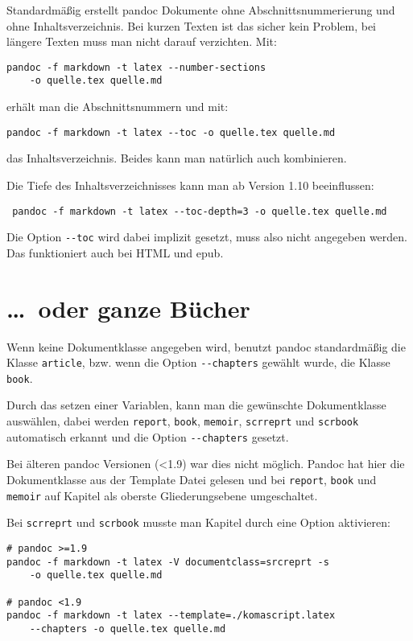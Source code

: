 \documentclass[11pt,ngerman,a4paper]{article}
\begin{document}
Standardmäßig erstellt pandoc Dokumente ohne Abschnittsnummerierung und
ohne Inhaltsverzeichnis. Bei kurzen Texten ist das sicher kein Problem,
bei längere Texten muss man nicht darauf verzichten. Mit:

\begin{verbatim}
pandoc -f markdown -t latex --number-sections 
    -o quelle.tex quelle.md
\end{verbatim}

erhält man die Abschnittsnummern und mit:

\begin{verbatim}
pandoc -f markdown -t latex --toc -o quelle.tex quelle.md
\end{verbatim}

das Inhaltsverzeichnis. Beides kann man natürlich auch kombinieren.

Die Tiefe des Inhaltsverzeichnisses kann man ab Version 1.10
beeinflussen:

\begin{verbatim}
 pandoc -f markdown -t latex --toc-depth=3 -o quelle.tex quelle.md
\end{verbatim}

Die Option \texttt{-{}-toc} wird dabei implizit gesetzt, muss also nicht
angegeben werden. Das funktioniert auch bei HTML und epub.

\section{\ldots{}~oder ganze Bücher}\label{oder-ganze-buxfccher}

Wenn keine Dokumentklasse angegeben wird, benutzt pandoc standardmäßig
die Klasse \texttt{article}, bzw. wenn die Option \texttt{-{}-chapters}
gewählt wurde, die Klasse \texttt{book}.

Durch das setzen einer Variablen, kann man die gewünschte Dokumentklasse
auswählen, dabei werden \texttt{report}, \texttt{book}, \texttt{memoir},
\texttt{scrreprt} und \texttt{scrbook} automatisch erkannt und die
Option \texttt{-{}-chapters} gesetzt.

Bei älteren pandoc Versionen (\textless{}1.9) war dies nicht möglich.
Pandoc hat hier die Dokumentklasse aus der Template Datei gelesen und
bei \texttt{report}, \texttt{book} und \texttt{memoir} auf Kapitel als
oberste Gliederungsebene umgeschaltet.

Bei \texttt{scrreprt} und \texttt{scrbook} musste man Kapitel durch eine
Option aktivieren:

\begin{verbatim}
# pandoc >=1.9
pandoc -f markdown -t latex -V documentclass=srcreprt -s
    -o quelle.tex quelle.md

# pandoc <1.9
pandoc -f markdown -t latex --template=./komascript.latex 
    --chapters -o quelle.tex quelle.md
\end{verbatim}
\end{document}
